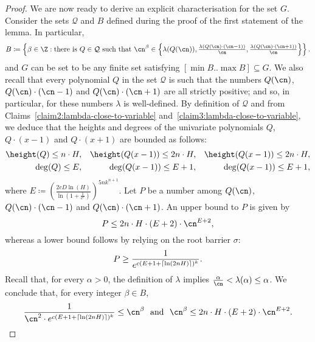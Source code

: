 \begin{proof}
        We are now ready to derive an explicit characterisation for the set $G$.
        Consider the sets $\mathcal{Q}$ and $B$ defined during the proof of the first statement of the lemma. In particular,
        \[ 
            B \coloneqq \left\{ \beta \in \Z : \text{there is } Q \in \mathcal{Q} \text{ such that } \cn^{\beta} \in \Big\{{\textstyle\lambda(Q(\cn)), \frac{\lambda(Q(\cn) \cdot (\cn-1))}{\cn}, \frac{\lambda(Q(\cn) \cdot (\cn+1))}{\cn}}\Big\}
            \right\}.
        \]
        and $G$ can be set to be any finite set satisfying $[\min B..\max B] \subseteq G$. We also recall that every polynomial $Q$ in the set $\mathcal{Q}$ is such that the numbers $Q(\cn)$, $Q(\cn) \cdot (\cn-1)$ and $Q(\cn) \cdot (\cn+1)$ are all strictly positive; and so, in particular, for these numbers $\lambda$ is well-defined.
        By definition of $\mathcal{Q}$ and from Claims~\ref{claim2:lambda-close-to-variable} 
        and~\ref{claim3:lambda-close-to-variable}, we deduce that the heights and degrees of the univariate polynomials $Q$, $Q \cdot (x-1)$ and $Q \cdot (x+1)$ are bounded as follows: 
        \begin{align*}
          \height(Q) \leq n \cdot H,
          &&\height(Q(x-1)) \leq 2n \cdot H, 
          &&\height(Q(x-1)) \leq 2n \cdot H,\\ 
          \deg(Q) \leq E,
          &&\deg(Q(x-1)) \leq E+1, 
          &&\deg(Q(x-1)) \leq E+1,
        \end{align*}
        where $E \coloneqq \left(\frac{2cD\ln(H)}{\ln(1 + \frac{1}{e^c})}\right)^{5nk^{n+1}}$. Let $P$ be a number among $Q(\cn)$, $Q(\cn) \cdot (\cn-1)$ and $Q(\cn) \cdot (\cn+1)$.
        An upper bound to $P$ is given by 
        \begin{equation*} 
          P \leq 2n \cdot H \cdot (E+2) \cdot \cn^{E+2},
        \end{equation*}
        whereas a lower bound follows by relying on the root barrier $\sigma$: 
        \begin{equation*} 
          P \geq \frac{1}{e^{c(E+1+\left\lceil\ln(2nH)\right\rceil)^k}}.
        \end{equation*}
        Recall that, for every $\alpha > 0$, the definition of $\lambda$ implies $\frac{\alpha}{\cn} < \lambda(\alpha) \leq \alpha$.
        We conclude that, for every integer $\beta \in B$, 
        \begin{equation*} 
          \frac{1}{\cn^2 \cdot e^{c(E+1+\ceil{\ln(2nH)})^k}} \leq \cn^{\beta} \text{ \ and \ } \cn^{\beta} \leq 2n \cdot H \cdot (E+2) \cdot \cn^{E+2}.
        \end{equation*}

\end{proof}
